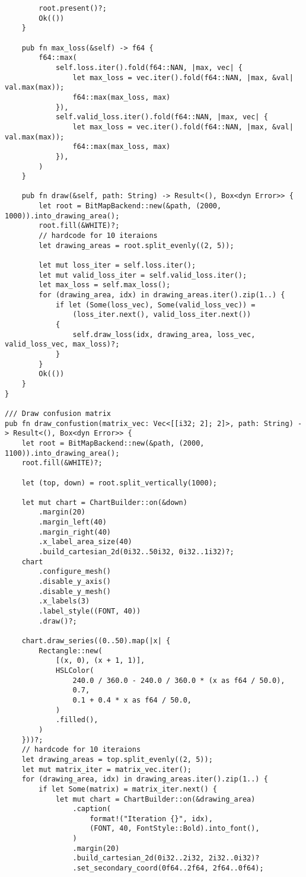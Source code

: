 \begin{code}
\begin{verbatim}
        root.present()?;
        Ok(())
    }

    pub fn max_loss(&self) -> f64 {
        f64::max(
            self.loss.iter().fold(f64::NAN, |max, vec| {
                let max_loss = vec.iter().fold(f64::NAN, |max, &val| val.max(max));
                f64::max(max_loss, max)
            }),
            self.valid_loss.iter().fold(f64::NAN, |max, vec| {
                let max_loss = vec.iter().fold(f64::NAN, |max, &val| val.max(max));
                f64::max(max_loss, max)
            }),
        )
    }

    pub fn draw(&self, path: String) -> Result<(), Box<dyn Error>> {
        let root = BitMapBackend::new(&path, (2000, 1000)).into_drawing_area();
        root.fill(&WHITE)?;
        // hardcode for 10 iteraions
        let drawing_areas = root.split_evenly((2, 5));

        let mut loss_iter = self.loss.iter();
        let mut valid_loss_iter = self.valid_loss.iter();
        let max_loss = self.max_loss();
        for (drawing_area, idx) in drawing_areas.iter().zip(1..) {
            if let (Some(loss_vec), Some(valid_loss_vec)) =
                (loss_iter.next(), valid_loss_iter.next())
            {
                self.draw_loss(idx, drawing_area, loss_vec, valid_loss_vec, max_loss)?;
            }
        }
        Ok(())
    }
}

/// Draw confusion matrix
pub fn draw_confustion(matrix_vec: Vec<[[i32; 2]; 2]>, path: String) -> Result<(), Box<dyn Error>> {
    let root = BitMapBackend::new(&path, (2000, 1100)).into_drawing_area();
    root.fill(&WHITE)?;

    let (top, down) = root.split_vertically(1000);

    let mut chart = ChartBuilder::on(&down)
        .margin(20)
        .margin_left(40)
        .margin_right(40)
        .x_label_area_size(40)
        .build_cartesian_2d(0i32..50i32, 0i32..1i32)?;
    chart
        .configure_mesh()
        .disable_y_axis()
        .disable_y_mesh()
        .x_labels(3)
        .label_style((FONT, 40))
        .draw()?;

    chart.draw_series((0..50).map(|x| {
        Rectangle::new(
            [(x, 0), (x + 1, 1)],
            HSLColor(
                240.0 / 360.0 - 240.0 / 360.0 * (x as f64 / 50.0),
                0.7,
                0.1 + 0.4 * x as f64 / 50.0,
            )
            .filled(),
        )
    }))?;
    // hardcode for 10 iteraions
    let drawing_areas = top.split_evenly((2, 5));
    let mut matrix_iter = matrix_vec.iter();
    for (drawing_area, idx) in drawing_areas.iter().zip(1..) {
        if let Some(matrix) = matrix_iter.next() {
            let mut chart = ChartBuilder::on(&drawing_area)
                .caption(
                    format!("Iteration {}", idx),
                    (FONT, 40, FontStyle::Bold).into_font(),
                )
                .margin(20)
                .build_cartesian_2d(0i32..2i32, 2i32..0i32)?
                .set_secondary_coord(0f64..2f64, 2f64..0f64);


\end{verbatim}
\end{code}
